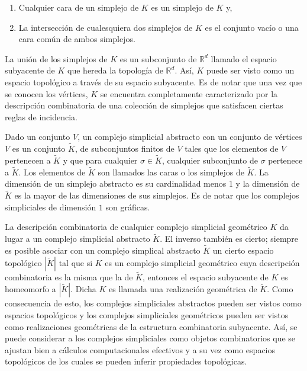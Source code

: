\begin{enumerate}[label=\roman*)]
    \item Cualquier cara de un simplejo de $K$ es un simplejo de $K$ y,
    
    \item La intersecci\'on de cualesquiera dos simplejos de $K$ es el conjunto vac\'io o una cara com\'un
    de ambos simplejos.
    
\end{enumerate}

La uni\'on de los simplejos de $K$ es un subconjunto de $\mathbb{R}^{d}$ llamado el espacio subyacente
de $K$ que hereda la topolog\'ia de $\mathbb{R}^{d}$. As\'i, $K$ puede ser visto como un espacio
topol\'ogico a trav\'es de su espacio subyacente. Es de notar que una vez que se conocen los v\'ertices,
$K$ se encuentra completamente caracterizado por la descripci\'on combinatoria de una colecci\'on de
simplejos que satisfacen ciertas reglas de incidencia.

Dado un conjunto $V$, un complejo simplicial abstracto con un conjunto de v\'ertices $V$ es un conjunto
$\tilde{K}$, de subconjuntos finitos de $V$ tales que los elementos de $V$ pertenecen a $\tilde{K}$ y
que para cualquier $\sigma \in \tilde{K}$, cualquier subconjunto de $\sigma$ pertenece a $\tilde{K}$.
Los elementos de $\tilde{K}$ son llamados las caras o los simplejos de $\tilde{K}$. La dimensi\'on
de un simplejo abstracto es su cardinalidad menos 1 y la dimensi\'on de $\tilde{K}$ es la mayor de las
dimensiones de sus simplejos. Es de notar que los complejos simpliciales de dimensi\'on $1$
son gr\'aficas.

La descripci\'on combinatoria de cualquier complejo simplicial geom\'etrico $K$ da lugar a un complejo
simplicial abstracto $\tilde{K}$. El inverso tambi\'en es cierto; siempre es posible asociar con un
complejo simplical abstracto $\tilde{K}$ un cierto espacio topol\'ogico $|\tilde{K}|$
tal que si $K$ es un complejo simplicial geom\'etrico cuya descripci\'on combinatoria es la misma
que la de $\tilde{K}$, entonces el espacio subyacente de $K$ es homeomorfo a $|\tilde{K}|$.
Dicha $K$ es llamada una realizaci\'on geom\'etrica de $\tilde{K}$. Como consecuencia de esto,
los complejos simpliciales abstractos pueden ser vistos como espacios topol\'ogicos y los complejos
simpliciales geom\'etricos pueden ser vistos como realizaciones geom\'etricas de la estructura combinatoria
subyacente. As\'i, se puede considerar a los complejos simpliciales como objetos combinatorios que se
ajustan bien a c\'alculos computacionales efectivos y a su vez como espacios topol\'ogicos de los cuales se pueden
inferir propiedades topol\'ogicas.

